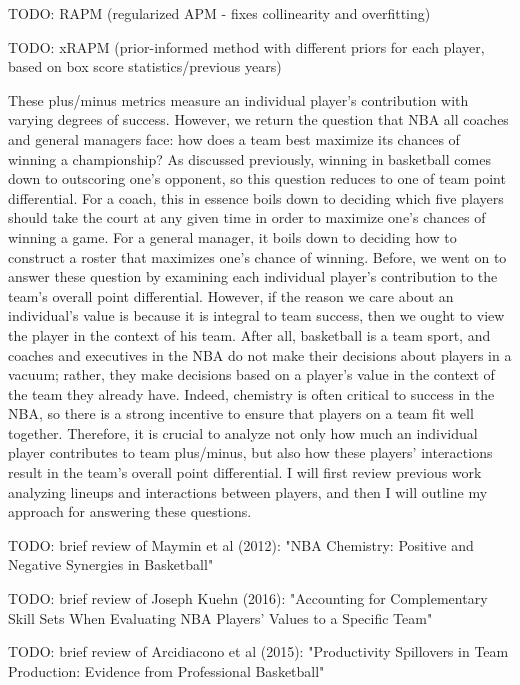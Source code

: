 TODO: RAPM (regularized APM - fixes collinearity and overfitting)

TODO: xRAPM (prior-informed method with different priors for each player, based
on box score statistics/previous years)


These plus/minus metrics measure an individual player's contribution with
varying degrees of success. However, we return the question that NBA all coaches
and general managers face: how does a team best maximize its chances of winning
a championship? As discussed previously, winning in basketball comes down to
outscoring one's opponent, so this question reduces to one of team point
differential. For a coach, this in essence boils down to deciding which five
players should take the court at any given time in order to maximize one's
chances of winning a game. For a general manager, it boils down to deciding how
to construct a roster that maximizes one's chance of winning. Before, we went on
to answer these question by examining each individual player's contribution to
the team's overall point differential.  However, if the reason we care about an
individual's value is because it is integral to team success, then we ought to
view the player in the context of his team. After all, basketball is a team
sport, and coaches and executives in the NBA do not make their decisions about
players in a vacuum; rather, they make decisions based on a player’s value in
the context of the team they already have. Indeed, chemistry is often critical
to success in the NBA, so there is a strong incentive to ensure that players on
a team fit well together. Therefore, it is crucial to analyze not only how much
an individual player contributes to team plus/minus, but also how these players'
interactions result in the team's overall point differential. I will first
review previous work analyzing lineups and interactions between players, and
then I will outline my approach for answering these questions.

TODO: brief review of Maymin et al (2012): "NBA Chemistry: Positive and Negative
Synergies in Basketball"

TODO: brief review of Joseph Kuehn (2016): "Accounting for Complementary Skill
Sets When Evaluating NBA Players' Values to a Specific Team"

TODO: brief review of Arcidiacono et al (2015): "Productivity Spillovers in Team
Production: Evidence from Professional Basketball"
